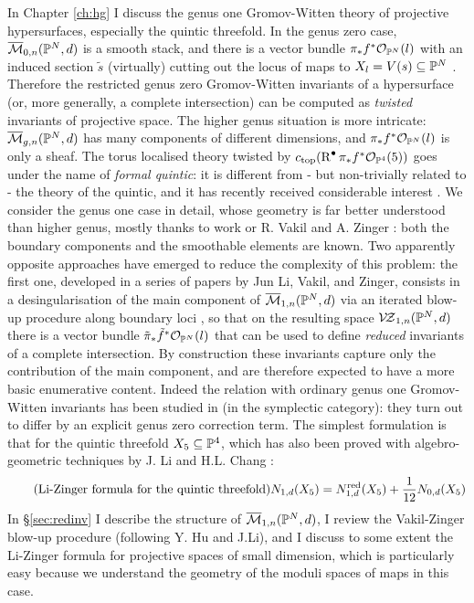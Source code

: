 In Chapter \ref{ch:hg} I discuss the genus one Gromov-Witten theory of projective hypersurfaces, especially the quintic threefold. In the genus zero case, $\overline{\mathcal{M}}_{0,n}(\mathbb P^N,d)$ is a smooth stack, and there is a vector bundle $\pi_*f^*\mathcal{O}_{\mathbb P^N}(l)$ with an induced section $\tilde{s}$ (virtually) cutting out the locus of maps to $X_l=V(s)\subseteq \mathbb P^N$ \cite{CKL}. Therefore the restricted genus zero Gromov-Witten invariants of a hypersurface (or, more generally, a complete intersection) can be computed as \emph{twisted} invariants of projective space. The higher genus situation is more intricate: $\overline{\mathcal{M}}_{g,n}(\mathbb P^N,d)$ has many components of different dimensions, and $\pi_*f^*\mathcal{O}_{\mathbb P^N}(l)$ is only a sheaf. The torus localised theory twisted by $c_{\rm{top}}(\operatorname{R}^{\bullet}\pi_*f^*\mathcal{O}_{\mathbb P^4}(5))$ goes under the name of \emph{formal quintic}: it is different from - but non-trivially related to - the theory of the quintic, and it has recently received considerable interest \cites{LhoPandha,GJR}. We consider the genus one case in detail, whose geometry is far better understood than higher genus, mostly thanks to work or R. Vakil and A. Zinger \cites{Vre,VZpreview}: both the boundary components and the smoothable elements are known. Two apparently opposite approaches have emerged to reduce the complexity of this problem: the first one, developed in a series of papers by Jun Li, Vakil, and Zinger, consists in a desingularisation of the main component of $\overline{\mathcal{M}}_{1,n}(\mathbb P^N,d)$ via an iterated blow-up procedure along boundary loci \cites{VZ,HL}, so that on the resulting space $\mathcal{V\!Z}_{1,n}(\mathbb P^N,d)$ there is a vector bundle $\tilde{\pi}_*\tilde{f}^*\mathcal{O}_{\mathbb P^N}(l)$ that can be used to define \emph{reduced} invariants of a complete intersection. By construction these invariants capture only the contribution of the main component, and are therefore expected to have a more basic enumerative content. Indeed the relation with ordinary genus one Gromov-Witten invariants has been studied in \cites{LZ,zingerstvsred} (in the symplectic category): they turn out to differ by an explicit genus zero correction term. The simplest formulation is that for the quintic threefold $X_5\subseteq\mathbb P^4$, which has also been proved with algebro-geometric techniques by J. Li and H.L. Chang \cite{CL}:
\begin{equation}\tag{Li-Zinger formula for the quintic threefold}
 N_{1,d}(X_5)=N_{1,d}^{\rm{red}}(X_5)+\frac{1}{12}N_{0,d}(X_5)
\end{equation}
In \S \ref{sec:redinv} I describe the structure of $\overline{\mathcal{M}}_{1,n}(\mathbb P^N,d)$, I review the Vakil-Zinger blow-up procedure (following Y. Hu and J.Li), and I discuss to some extent the Li-Zinger formula for projective spaces of small dimension, which is particularly easy because we understand the geometry of the moduli spaces of maps in this case.

